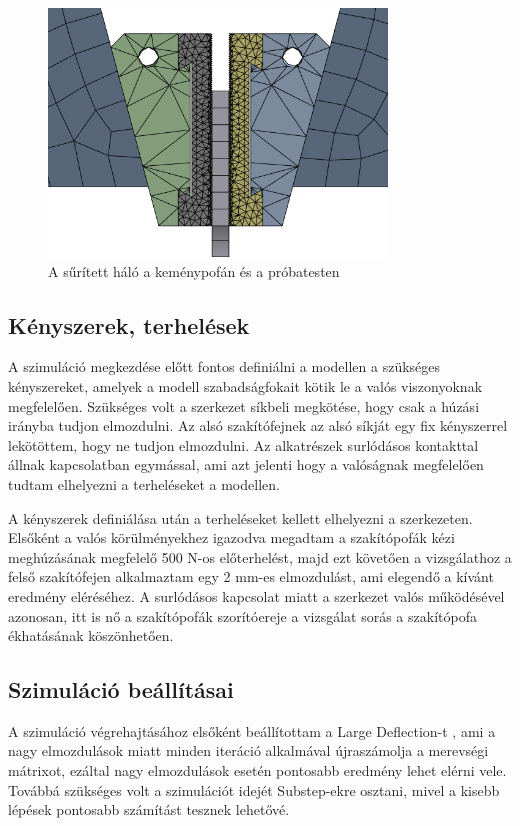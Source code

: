 \documentclass[12pt,a4paper,oneside]{report}
\begin{document}
\begin{figure}[H]
    \centering
    \includegraphics[width=9cm]{figures/mesh_3.png}
    \caption{A sűrített háló a keménypofán és a próbatesten}
    \label{Fig:mesh_3}
\end{figure}

\subsection{Kényszerek, terhelések}
A szimuláció megkezdése előtt fontos definiálni a modellen a szükséges kényszereket, amelyek a modell szabadságfokait kötik le a valós viszonyoknak megfelelően. Szükséges volt a szerkezet síkbeli megkötése, hogy csak a húzási irányba tudjon elmozdulni. Az alsó szakítófejnek az alsó síkját egy fix kényszerrel lekötöttem, hogy ne tudjon elmozdulni. Az alkatrészek surlódásos kontakttal állnak kapcsolatban egymással, ami azt jelenti hogy a valóságnak megfelelően tudtam elhelyezni a terheléseket a modellen.

A kényszerek definiálása után a terheléseket kellett elhelyezni a szerkezeten. Elsőként a valós körülményekhez igazodva megadtam a szakítópofák kézi meghúzásának megfelelő 500 N-os előterhelést, majd ezt követően a vizsgálathoz a felső szakítófejen alkalmaztam egy 2 mm-es elmozdulást, ami elegendő a kívánt eredmény eléréséhez. A surlódásos kapcsolat miatt a szerkezet valós működésével azonosan, itt is nő a szakítópofák szorítóereje a vizsgálat sorás a szakítópofa ékhatásának köszönhetően.

\subsection{Szimuláció beállításai}
A szimuláció végrehajtásához elsőként beállítottam a \glqq Large Deflection\grqq-t , ami a nagy elmozdulások miatt minden iteráció alkalmával újraszámolja a merevségi mátrixot, ezáltal nagy elmozdulások esetén pontosabb eredmény lehet elérni vele. Továbbá szükséges volt a szimulációt idejét \glqq Substep\grqq-ekre osztani, mivel a kisebb lépések pontosabb számítást tesznek lehetővé.
\end{document}
